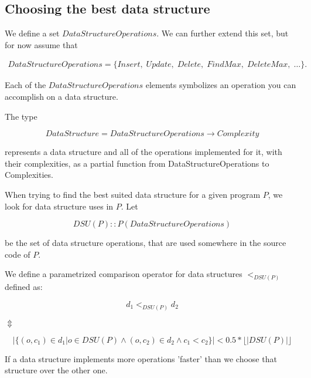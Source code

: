 \documentclass[11pt]{article}
\begin{document}
	\subsection{Choosing the best data structure}

		We define a set $DataStructureOperations$. We can further extend this set, but for now assume that

		\begin{eqnarray}
			DataStructureOperations = \{Insert, \; Update, \; Delete, \; FindMax,\; DeleteMax, \; \dots\}.
		\end{eqnarray}

		Each of the $DataStructureOperations$ elements symbolizes an operation you can accomplish on a data
		structure.

		The type

		\begin{equation}\label{data-structure-type}
			DataStructure = DataStructureOperations \rightarrow Complexity
		\end{equation}

		represents a data structure and all of the operations implemented for it, with their complexities, as a
		partial function from DataStructureOperations to Complexities.

		When trying to find the best suited data structure for a given program $P$, we look for data structure
		uses in $P$. Let

		\begin{equation}\label{dsu-type}
			DSU(P) :: P(DataStructureOperations)
		\end{equation}

		be the set of data structure operations, that are used somewhere in the source code of $P$.

		We define a parametrized comparison operator for data structures $<_{DSU(P)}$ defined as:

		\begin{center}

			\begin{equation}
				d_1 <_{DSU(P)} d_2
			\end{equation}

			$\Updownarrow$

			\begin{equation} \label{data-structure-order}
				|\{(o, c_1) \in d_1 | o \in DSU(P) \wedge (o,c_2) \in d_2 \wedge c_1 < c_2 \}| < 0.5 *
				\lfloor |DSU(P)| \rfloor
			\end{equation}

		\end{center} If a data structure implements more operations 'faster' than we choose that structure over
		the other one.
\end{document}

